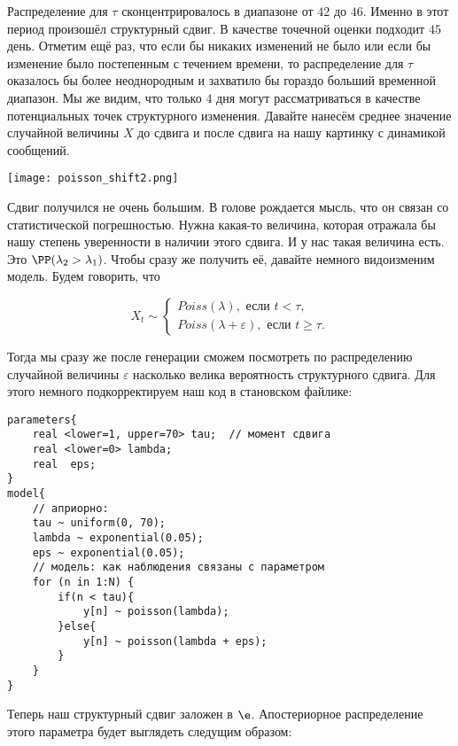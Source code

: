 Распределение для $\tau$ сконцентрировалось в диапазоне от $42$ до $46$. Именно в этот период произошёл структурный сдвиг. В качестве точечной оценки подходит $45$ день. Отметим ещё раз, что если бы никаких изменений не было или если бы изменение было постепенным с течением времени, то распределение для $\tau$ оказалось бы более неоднородным и захватило бы гораздо больший временной диапазон. Мы же видим, что только $4$ дня могут рассматриваться в качестве потенциальных точек структурного изменения.  Давайте нанесём среднее значение случайной величины $X$ до сдвига и после сдвига на нашу картинку с динамикой сообщений. 

\begin{center}
	\texttt{[image: poisson\_shift2.png]}
\end{center} 

Сдвиг получился не очень большим. В голове рождается мысль, что он связан со статистической погрешностью. Нужна какая-то величина, которая отражала бы нашу степень уверенности в наличии этого сдвига. И у нас такая величина есть. Это $\PP(\lambda_2 > \lambda_1)$. Чтобы сразу же получить её, давайте немного видоизменим модель. Будем говорить, что 

\begin{equation*}
X_t \sim \begin{cases}  Poiss(\lambda), \text{ если } t < \tau, \\  Poiss(\lambda + \varepsilon), \text{ если } t \ge \tau. \end{cases}
\end{equation*}

Тогда мы сразу же после генерации сможем посмотреть по распределению случайной величины $\varepsilon$ насколько велика вероятность структурного сдвига.  Для этого немного подкорректируем наш код в становском файлике:

\begin{verbatim}
parameters{
    real <lower=1, upper=70> tau;  // момент сдвига
    real <lower=0> lambda;
    real  eps;
}
model{
    // априорно:
    tau ~ uniform(0, 70); 
    lambda ~ exponential(0.05);
    eps ~ exponential(0.05);
    // модель: как наблюдения связаны с параметром
    for (n in 1:N) {
        if(n < tau){
            y[n] ~ poisson(lambda);
        }else{
            y[n] ~ poisson(lambda + eps);
        }
    }
}
\end{verbatim}

Теперь наш структурный сдвиг заложен в $\e$. Апостериорное распределение этого параметра будет выглядеть следущим образом:

